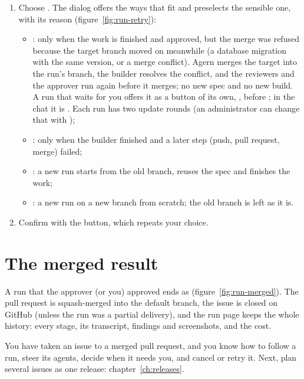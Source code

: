 \begin{enumerate}
  \item Choose . The dialog offers the ways that fit and preselects the sensible one,
    with its reason (figure~\ref{fig:run-retry}):
    \begin{itemize}
      \item {}: only when the work is finished and approved, but the merge was
        refused because the target branch moved on meanwhile (a database migration with the same
        version, or a merge conflict). Agern merges the target into the run's branch, the builder
        resolves the conflict, and the reviewers and the approver run again before it merges; no new
        spec and no new build. A run that waits for you offers it as a button of its own,
        , before ; in the chat it is
        . Each run has two update rounds (an administrator can
        change that with );
      \item {}: only when the builder finished and a later step (push,
        pull request, merge) failed;
      \item {}: a new run starts from the old branch, reuses the spec
        and finishes the work;
      \item {}: a new run on a new branch from scratch; the old branch is left as it is.
    \end{itemize}
  \item Confirm with the button, which repeats your choice.
\end{enumerate}


\section{The merged result}\label{sec:merged}

A run that the approver (or you) approved ends as  (figure~\ref{fig:run-merged}). The
pull request is squash-merged into the default branch, the issue is closed on GitHub (unless the run
was a partial delivery), and the run
page keeps the whole history: every stage, its transcript, findings and screenshots, and the cost.


\whatyouhave
You have taken an issue to a merged pull request, and you know how to follow a run, steer its
agents, decide when it needs you, and cancel or retry it. Next, plan several issues as one
release: chapter~\ref{ch:releases}.
